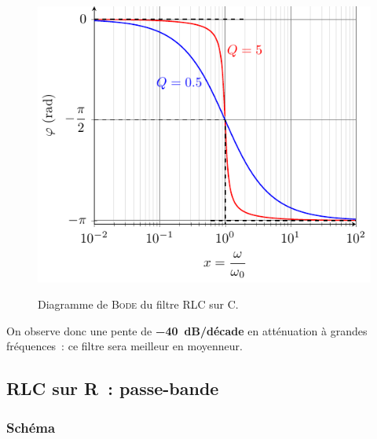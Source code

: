 \documentclass[../../main/main.tex]{subfiles}
\begin{document}
\begin{figure}[htbp!]
{{		}{
			\includegraphics[width=.95\linewidth]{RLCC_bode-phase}
		}
		\vspace{-15pt}
	}
	\caption{Diagramme de \textsc{Bode} du filtre RLC sur C.}
	\label{fig:rlcbode}
\end{figure}

On observe donc une pente de \textbf{\SI{-40}{dB/décade}} en atténuation à
grandes fréquences~: ce filtre sera meilleur en moyenneur.

\subsection{RLC sur R~: passe-bande}
\subsubsection{Schéma}
\smallbreak
\noindent
\begin{minipage}{\linewidth}
	\begin{center}
		\vspace{-15pt}
	\end{center}
\end{minipage}
\end{document}
